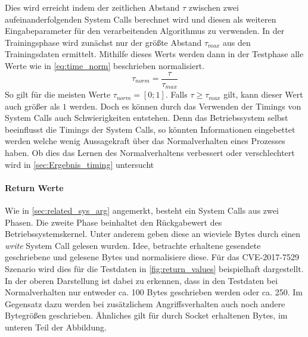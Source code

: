                 Dies wird erreicht indem der zeitlichen Abstand $\tau$ zwischen zwei aufeinanderfolgenden System Calls berechnet wird und diesen als weiteren Eingabeparameter für den verarbeitenden Algorithmus zu verwenden.
                In der Trainingsphase wird zunächst nur der größte Abstand $\tau_{max}$ aus den Trainingsdaten ermittelt.
                Mithilfe dieses Werts werden dann in der Testphase alle Werte wie in \autoref{eq:time_norm} beschrieben normalisiert.
                \begin{equation}\label{eq:time_norm}
                    \tau_{norm} = \frac{\tau}{\tau_{max}}
                \end{equation}
                So gilt für die meisten Werte $\tau_{norm}=[0;1]$.
                Falls $\tau\geq\tau_{max}$ gilt, kann dieser Wert auch größer als $1$ werden.
                Doch es können durch das Verwenden der Timings von System Calls auch Schwierigkeiten entstehen.
                Denn das Betriebssystem selbst beeinflusst die Timings der System Calls, so könnten Informationen eingebettet werden welche wenig Aussagekraft über das Normalverhalten eines Prozesses haben.
                Ob dies das Lernen des Normalverhaltens verbessert oder verschlechtert wird in \autoref{sec:Ergebnis_timing} untersucht

            \paragraph{Return Werte}

                Wie in \autoref{sec:related_sys_arg} angemerkt, besteht ein System Calls aus zwei \glqq Phasen\grqq.
                Die zweite Phase beinhaltet den Rückgabewert des Betriebssystemskernel.
                Unter anderem geben diese an wieviele Bytes durch einen \textit{write} System Call gelesen wurden.
                Idee, betrachte erhaltene gesendete geschriebene und gelesene Bytes und normalisiere diese.
                Für das CVE-2017-7529 Szenario wird dies für die Testdaten in \autoref{fig:return_values} beispielhaft dargestellt.
                In der oberen Darstellung ist dabei zu erkennen, dass in den Testdaten bei Normalverhalten nur entweder ca. 100 Bytes geschrieben werden oder ca. 250.
                Im Gegensatz dazu werden bei zusätzlichem Angriffsverhalten auch noch andere Bytegrößen geschrieben.
                Ähnliches gilt für durch Socket erhaltenen Bytes, im unteren Teil der Abbildung.

